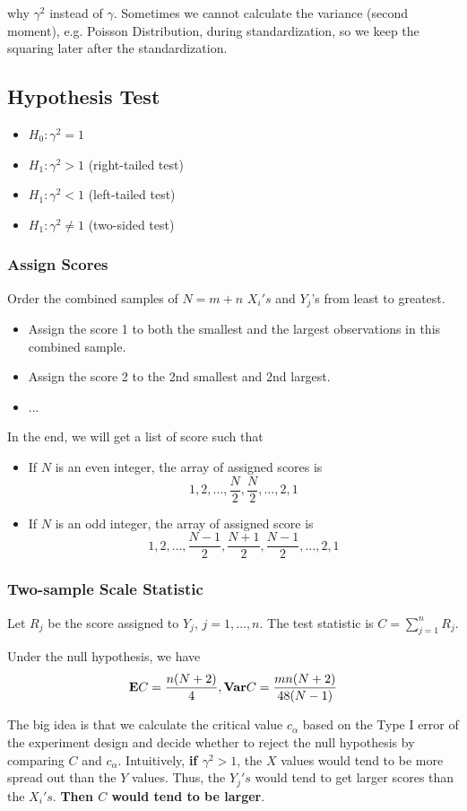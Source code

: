 why $\gamma^2$ instead of $\gamma$. Sometimes we cannot calculate the variance (second moment), e.g. Poisson Distribution, during  standardization, so we keep the squaring later after the standardization.
\subsection{Hypothesis Test}

\begin{itemize}
	\item $H_0: \gamma^2 = 1$
	\item $H_1: \gamma^2 > 1$ (right-tailed test)
	\item $H_1: \gamma^2 < 1$ (left-tailed test)
	\item $H_1: \gamma^2 \neq 1$ (two-sided test)
\end{itemize}

\subsubsection{Assign Scores}
Order the combined samples of $N = m + n$ $X_i's$ and $Y_j$'s from least to greatest.
\begin{itemize}
	\item Assign the score 1 to both the smallest and the largest observations in this combined sample.
	\item Assign the score 2 to the 2nd smallest and 2nd largest.
	\item ...
\end{itemize}
In the end, we will get a list of score such that
\begin{itemize}
	\item If $N$ is an even integer, the array of assigned scores is 
	\[1, 2, \dots, \frac{N}{2}, \frac{N}{2}, \dots, 2, 1\]
	\item If $N$ is an odd integer, the array of assigned score is 
	\[1, 2, \dots, \frac{N-1}{2},\frac{N+1}{2},\frac{N-1}{2}, \dots, 2, 1\]
\end{itemize}
\subsubsection{Two-sample Scale Statistic}
Let $R_j$ be the score assigned to $Y_j$, $j = 1, \dots, n$.
The test statistic is $C = \sum_{j=1}^{n} R_j$.

Under the null hypothesis, we have
\[{\mathbf E} C = \frac{n(N+2)}{4}, {\mathbf{Var}} C = \frac{mn(N+2)}{48(N-1)}\]

The big idea is that we calculate the critical value $c_\alpha$ based on the Type I error of the experiment design and decide whether to reject the null hypothesis by comparing $C$ and $c_\alpha$. Intuitively, \textbf{if $\gamma^2 > 1$}, the $X$ values would tend to be more spread out than the $Y$ values. Thus, the $Y_j's$ would tend to get larger scores than the $X_i's$. \textbf{Then $C$ would tend to be larger}.

